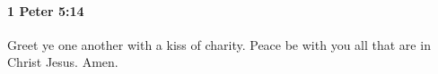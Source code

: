 		\paragraph{1 Peter 5:14} %
			\label{1PETER-5-14}

			Greet ye one another with a kiss of charity.  Peace be with you all that are in Christ Jesus.  Amen.

			\begin{framed}
			\scriptsize
				\begin{compactdesc}
					\item[SBLG] 
				\end{compactdesc}
			\end{framed}